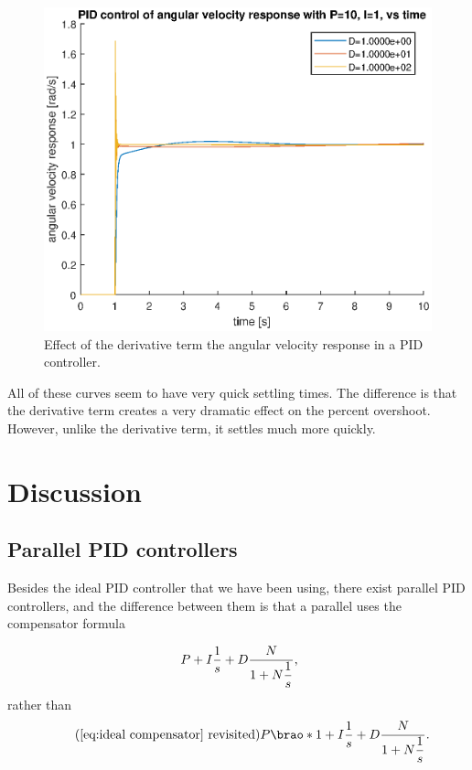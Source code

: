 \documentclass[12pt]{article}
\DeclarePairedDelimiter\brao()%
\begin{document}
\begin{figure}
    \centering
    \includegraphics[width=\linewidth]{img/task03_varying_d.eps}
    \caption{Effect of the derivative term the angular velocity response in a PID controller.}
    \label{fig:d on angular velocity}
\end{figure}

All of these curves seem to have very quick settling times. The difference is that the derivative term creates a very dramatic effect on the percent overshoot. However, unlike the derivative term, it settles much more quickly.

\section{Discussion}\label{sec:Discussion}

\subsection{Parallel PID controllers}

Besides the ideal PID controller that we have been using,
there exist parallel PID controllers,
and the difference between them
is that a parallel uses the compensator formula

\begin{equation}
    P + I\frac1s + D\frac{N}{\displaystyle1 + N\frac1s}\rlap,
\end{equation}
rather than
\begin{equation*}\tag{\ref{eq:ideal compensator} revisited}
    P\brao*{1 + I\frac1s + D\frac{N}{\displaystyle1 + N\frac1s}}\rlap.
\end{equation*}
\end{document}
